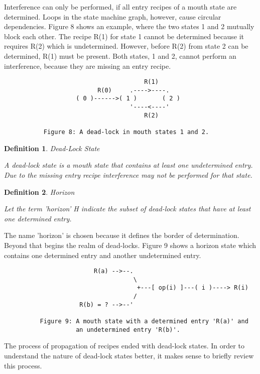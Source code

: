 \documentclass[12pt]{article}
\newtheorem{definition}{Definition}
\begin{document}
Interference can only be performed, if all entry recipes of a mouth state are
determined. Loops in the state machine graph, however, cause circular
dependencies.  Figure 8 shows an example, where the two states 1 and 2 mutually
block each other. The recipe R(1) for state 1 cannot be determined because it
requires R(2) which is undetermined. However, before R(2) from state 2 can be
determined, R(1) must be present. Both states, 1 and 2, cannot perform an
interference, because they are missing an entry recipe. 

\begin{verbatim}
                                       R(1)
                          R(0)     .---->----.
                    ( 0 )------>( 1 )       ( 2 )
                                   '----<----'
                                       R(2)

           Figure 8: A dead-lock in mouth states 1 and 2.
\end{verbatim}

\begin{definition}
    
Dead-Lock State

A dead-lock state is a mouth state that contains at least one undetermined
entry. Due to the missing entry recipe interference may not be performed
for that state.
\end{definition}

\begin{definition}
Horizon

Let the term 'horizon' H indicate the subset of dead-lock states that have
at least one determined entry.
\end{definition}

The name 'horizon' is chosen because it defines the border of determination.
Beyond that begins the realm of dead-locks. Figure 9 shows a horizon state
which contains one determined entry and another undetermined entry.

\begin{verbatim}
                         R(a) -->--.
                                    \
                                     +---[ op(i) ]---( i )----> R(i)
                                    /
                     R(b) = ? -->--'

          Figure 9: A mouth state with a determined entry 'R(a)' and 
                    an undetermined entry 'R(b)'.
\end{verbatim}

The process of propagation of recipes ended with dead-lock states. In order
to understand the nature of dead-lock states better, it makes sense to briefly
review this process. 
\end{document}
